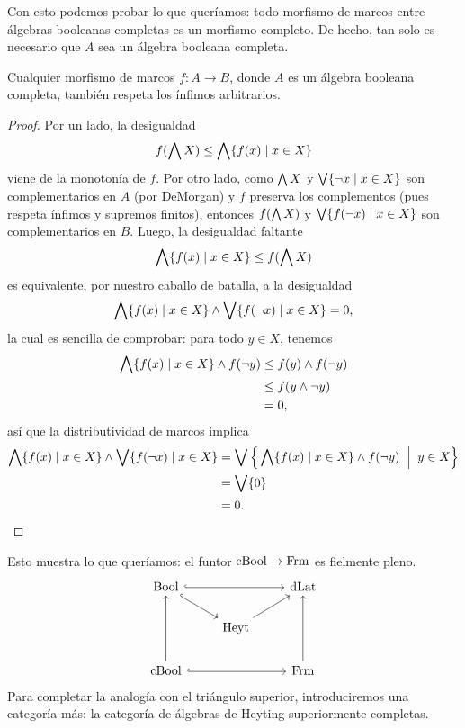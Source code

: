 Con esto podemos probar lo que queríamos: todo morfismo de marcos
entre álgebras booleanas completas es un morfismo completo.
De hecho, tan solo es necesario que $A$ sea un álgebra booleana
completa.
\begin{lemma}
    Cualquier morfismo de marcos $f:A\to B$,
    donde $A$ es un álgebra booleana completa,
    también respeta los ínfimos arbitrarios.
\end{lemma}
\begin{proof}
    Por un lado, la desigualdad
    \[
        f(\bigwedge X)\leq\bigwedge\{f(x)\mid x\in X\}
    \]
    viene de la monotonía de $f$.
    Por otro lado, como $\bigwedge X$ y $\bigvee\{\neg x\mid x\in X\}$
    son complementarios en $A$ (por DeMorgan)
    y $f$ preserva los complementos
    (pues respeta ínfimos y supremos finitos), entonces $f(\bigwedge X)$
    y $\bigvee\{f(\neg x)\mid x\in X\}$ son complementarios en $B$.
    Luego, la desigualdad faltante
    \[
        \bigwedge\{f(x)\mid x\in X\} \leq f(\bigwedge X)
    \]
    es equivalente, por nuestro caballo de batalla, a la desigualdad
    \[
        \bigwedge\{f(x)\mid x\in X\} \wedge \bigvee\{f(\neg x)\mid x\in X\} = 0,
    \]
    la cual es sencilla de comprobar: para todo $y\in X$, tenemos
    \begin{align*}
        \bigwedge\{f(x)\mid x\in X\} \wedge f(\neg y)
        &\leq f(y)\wedge f(\neg y) \\
        &\leq f(y\wedge \neg y) \\
        &= 0,
    \end{align*}
    así que la distributividad de marcos implica
    \begin{align*}
        \bigwedge\{f(x)\mid x\in X\} \wedge \bigvee\{f(\neg x)\mid x\in X\}
        &= \bigvee\Big\{\bigwedge\{f(x)\mid x\in X\}\wedge f(\neg y)
            \;\;\Big|\;\; y\in X\Big\} \\
        &= \bigvee\{0\} \\
        &= 0.
    \end{align*}
\end{proof}

Esto muestra lo que queríamos: el funtor $\mathrm{cBool}\to\mathrm{Frm}$ es fielmente
pleno.
\begin{equation}\label{diag:cuadrado-cba-frm}
\begin{tikzcd}
  \Bool \ar[dr,hook] \ar[rr,hook] &               & \DLat \\
                                  & \Heyt \ar[ur]         \\
  \CBA \ar[uu] \ar[rr,hook] &           & \Frm \ar[uu]
\end{tikzcd}
\end{equation}
Para completar la analogía con el triángulo superior, introduciremos
una categoría más: la categoría de álgebras de Heyting superiormente
completas.

